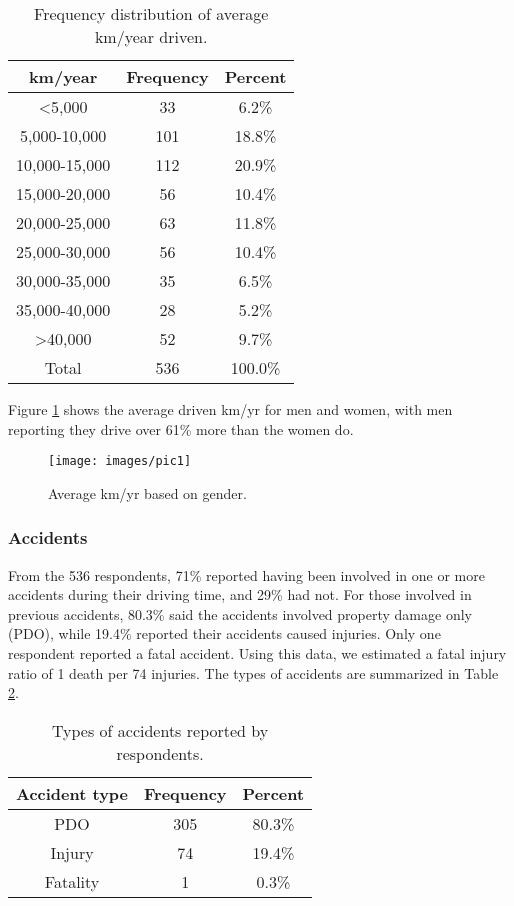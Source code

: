 \documentclass[preprint,12pt,a4paper,authoryear]{elsarticle}
\begin{document}
\begin{linenumbers}
\begin{table}[H]
\centering
\caption{Frequency distribution of average km/year driven.}
\label{tab:annualkm}
\begin{tabular}{@{}ccc@{}}
\toprule
\textbf{km/year} & \textbf{Frequency} & \textbf{Percent} \\ \midrule
\textless5,000 & 33 & 6.2\% \\
5,000-10,000 & 101 & 18.8\% \\
10,000-15,000 & 112 & 20.9\% \\
15,000-20,000 & 56 & 10.4\% \\
20,000-25,000 & 63 & 11.8\% \\
25,000-30,000 & 56 & 10.4\% \\
30,000-35,000 & 35 & 6.5\% \\
35,000-40,000 & 28 & 5.2\% \\
\textgreater40,000 & 52 & 9.7\% \\
Total & 536 & 100.0\% \\ \bottomrule
\end{tabular}
\end{table}

Figure \ref{fig:avekmgender} shows the average driven km/yr for men and women, with men reporting they drive over 61\% more than the women do.
%
\begin{figure}[H]
\centering
\texttt{[image: images/pic1]}  %
\caption{Average km/yr based on gender.}
\label{fig:avekmgender}
\end{figure}
%

\subsubsection{Accidents}
From the 536 respondents, 71\% reported having been involved in one or more accidents during their driving time, and 29\% had not. For those involved in previous accidents, 80.3\%  said the accidents involved property damage only (PDO), while 19.4\% reported their accidents caused injuries. Only one respondent reported a fatal accident. Using this data, we estimated a fatal injury ratio of 1 death per 74 injuries. The types of accidents are summarized in Table \ref{tab:accidents}.

\begin{table}[H]
\centering
\caption{Types of accidents reported by respondents.}
\label{tab:accidents}
\begin{tabular}{@{}ccc@{}}
\toprule
\textbf{Accident type} & \textbf{Frequency} & \textbf{Percent} \\ \midrule
PDO & 305 & 80.3\% \\
Injury & 74 & 19.4\% \\
Fatality & 1 & 0.3\% \\ \bottomrule
\end{tabular}
\end{table}


\end{linenumbers}
\end{document}
